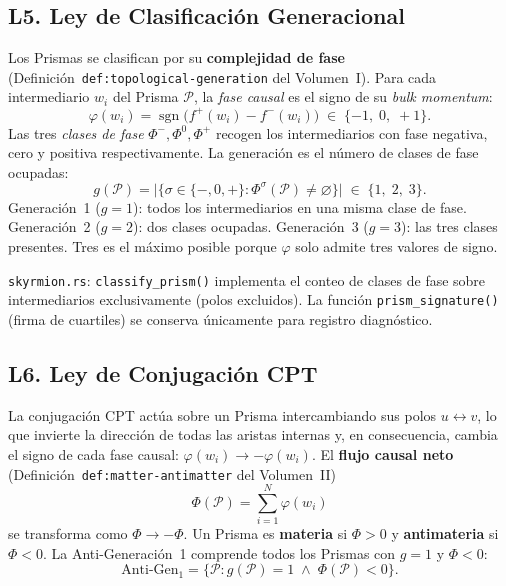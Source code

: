 \documentclass[11pt, a4paper, openany]{book}
\begin{document}
\subsection*{L5. Ley de Clasificaci\'on Generacional}
\label{law:generational-classification}

Los Prismas se clasifican por su \textbf{complejidad de fase}
(Definici\'on~\texttt{def:topological-generation} del Volumen~I).
Para cada intermediario $w_i$ del Prisma $\mathcal{P}$, la
\emph{fase causal} es el signo de su \emph{bulk momentum}:
\[
  \varphi(w_i) = \operatorname{sgn}\bigl(f^+(w_i) - f^-(w_i)\bigr)
  \;\in\; \{-1,\; 0,\; +1\}.
\]
Las tres \emph{clases de fase} $\Phi^{-}, \Phi^{0}, \Phi^{+}$
recogen los intermediarios con fase negativa, cero y positiva
respectivamente.  La generaci\'on es el n\'umero de clases de fase
ocupadas:
\begin{equation}
  g(\mathcal{P}) = \bigl|\{\sigma \in \{-,0,+\} :
    \Phi^{\sigma}(\mathcal{P}) \neq \varnothing\}\bigr|
  \;\in\; \{1,\; 2,\; 3\}.
  \label{eq:law-generation}
\end{equation}
Generaci\'on~1 ($g=1$): todos los intermediarios en una misma clase de
fase.  Generaci\'on~2 ($g=2$): dos clases ocupadas.  Generaci\'on~3
($g=3$): las tres clases presentes.  Tres es el m\'aximo posible
porque $\varphi$ solo admite tres valores de signo.

\medskip\noindent
\texttt{skyrmion.rs}: \texttt{classify\_prism()} implementa el conteo
de clases de fase sobre intermediarios exclusivamente (polos excluidos).
La funci\'on \texttt{prism\_signature()} (firma de cuartiles) se
conserva \'unicamente para registro diagn\'ostico.

\subsection*{L6. Ley de Conjugaci\'on CPT}
\label{law:cpt-conjugation}

La conjugaci\'on CPT act\'ua sobre un Prisma intercambiando sus polos
$u \leftrightarrow v$, lo que invierte la direcci\'on de todas las
aristas internas y, en consecuencia, cambia el signo de cada fase
causal: $\varphi(w_i) \to -\varphi(w_i)$.  El \textbf{flujo causal
neto} (Definici\'on~\texttt{def:matter-antimatter} del Volumen~II)
\[
  \Phi(\mathcal{P}) = \sum_{i=1}^{N} \varphi(w_i)
\]
se transforma como $\Phi \to -\Phi$.  Un Prisma es \textbf{materia}
si $\Phi > 0$ y \textbf{antimateria} si $\Phi < 0$.  La
Anti-Generaci\'on~1 comprende todos los Prismas con $g = 1$ y
$\Phi < 0$:
\begin{equation}
  \text{Anti-Gen}_1 = \bigl\{\mathcal{P} : g(\mathcal{P}) = 1
    \;\wedge\; \Phi(\mathcal{P}) < 0 \bigr\}.
  \label{eq:law-cpt}
\end{equation}
\end{document}
